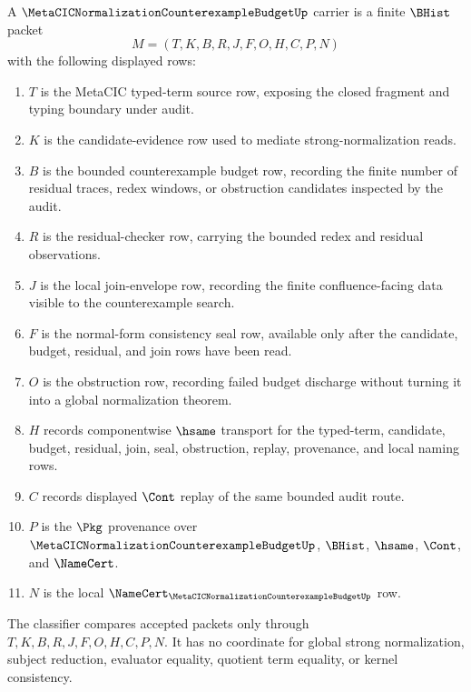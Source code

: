 \begin{definition}
\label{def:metacic-normalization-counterexample-budget-carrier}
A $\MetaCICNormalizationCounterexampleBudgetUp$ carrier is a finite $\BHist$ packet
$$
M=(T,K,B,R,J,F,O,H,C,P,N)
$$
with the following displayed rows:
\begin{enumerate}
\item $T$ is the MetaCIC typed-term source row, exposing the closed fragment and typing boundary under audit.
\item $K$ is the candidate-evidence row used to mediate strong-normalization reads.
\item $B$ is the bounded counterexample budget row, recording the finite number of residual traces, redex windows, or obstruction candidates inspected by the audit.
\item $R$ is the residual-checker row, carrying the bounded redex and residual observations.
\item $J$ is the local join-envelope row, recording the finite confluence-facing data visible to the counterexample search.
\item $F$ is the normal-form consistency seal row, available only after the candidate, budget, residual, and join rows have been read.
\item $O$ is the obstruction row, recording failed budget discharge without turning it into a global normalization theorem.
\item $H$ records componentwise $\hsame$ transport for the typed-term, candidate, budget, residual, join, seal, obstruction, replay, provenance, and local naming rows.
\item $C$ records displayed $\Cont$ replay of the same bounded audit route.
\item $P$ is the $\Pkg$ provenance over $\MetaCICNormalizationCounterexampleBudgetUp$, $\BHist$, $\hsame$, $\Cont$, and $\NameCert$.
\item $N$ is the local $\NameCert_{\MetaCICNormalizationCounterexampleBudgetUp}$ row.
\end{enumerate}
The classifier compares accepted packets only through $T,K,B,R,J,F,O,H,C,P,N$. It has no coordinate for global strong normalization, subject reduction, evaluator equality, quotient term equality, or kernel consistency.
\end{definition}

